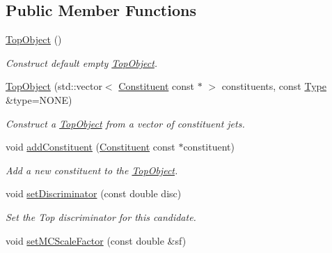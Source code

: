 \subsection*{Public Member Functions}
\begin{DoxyCompactItemize}
\item 
\hypertarget{classTopObject_a0eb6419f5a625d5ad777df5363e02f90}{\hyperlink{classTopObject_a0eb6419f5a625d5ad777df5363e02f90}{Top\-Object} ()}\label{classTopObject_a0eb6419f5a625d5ad777df5363e02f90}

\begin{DoxyCompactList}\small\item\em Construct default empty \hyperlink{classTopObject}{Top\-Object}. \end{DoxyCompactList}\item 
\hypertarget{classTopObject_a7888dbf304a6fb09af55b4a632cab5ef}{\hyperlink{classTopObject_a7888dbf304a6fb09af55b4a632cab5ef}{Top\-Object} (std\-::vector$<$ \hyperlink{classConstituent}{Constituent} const $\ast$ $>$ constituents, const \hyperlink{classTopObject_af82a20e421c29bc667af7cd73fc46ba4}{Type} \&type=N\-O\-N\-E)}\label{classTopObject_a7888dbf304a6fb09af55b4a632cab5ef}

\begin{DoxyCompactList}\small\item\em Construct a \hyperlink{classTopObject}{Top\-Object} from a vector of constituent jets. \end{DoxyCompactList}\item 
\hypertarget{classTopObject_adafc98b5660ac2ca92f9115668de2c10}{void \hyperlink{classTopObject_adafc98b5660ac2ca92f9115668de2c10}{add\-Constituent} (\hyperlink{classConstituent}{Constituent} const $\ast$constituent)}\label{classTopObject_adafc98b5660ac2ca92f9115668de2c10}

\begin{DoxyCompactList}\small\item\em Add a new constituent to the \hyperlink{classTopObject}{Top\-Object}. \end{DoxyCompactList}\item 
\hypertarget{classTopObject_abf5123e8c707e9059c8ec96b35643bef}{void \hyperlink{classTopObject_abf5123e8c707e9059c8ec96b35643bef}{set\-Discriminator} (const double disc)}\label{classTopObject_abf5123e8c707e9059c8ec96b35643bef}

\begin{DoxyCompactList}\small\item\em Set the Top discriminator for this candidate. \end{DoxyCompactList}\item 
\hypertarget{classTopObject_aa2764e34e00d4e19516c64bed555b4bc}{void \hyperlink{classTopObject_aa2764e34e00d4e19516c64bed555b4bc}{set\-M\-C\-Scale\-Factor} (const double \&sf)}\label{classTopObject_aa2764e34e00d4e19516c64bed555b4bc}


\end{DoxyCompactItemize}
